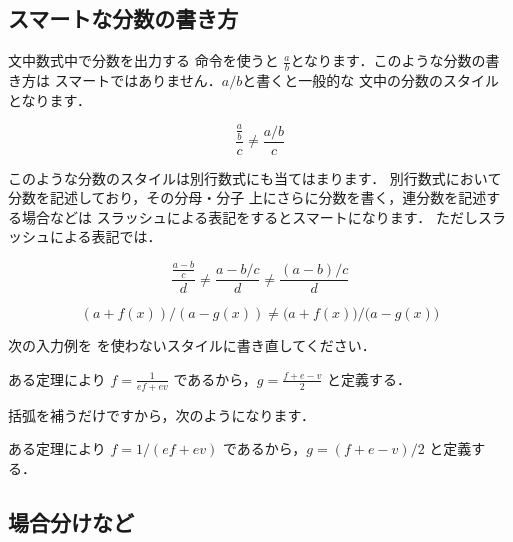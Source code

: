 \subsection{スマートな分数の書き方}
文中数式中で分数を出力する 命令を使うと
\(\frac{a}{b}\)となります．このような分数の書き方は
スマートではありません．\(a/b\)と書くと一般的な
文中の分数のスタイルとなります．
\begin{InOut}
\[ \frac{\frac{a}{b}}{c}\neq
   \frac{a/b}{c}             \]
\end{InOut}
このような分数のスタイルは別行数式にも当てはまります．
別行数式において分数を記述しており，その分母・分子
上にさらに分数を書く，連分数を記述する場合などは
スラッシュ\qu{\str/}による表記をするとスマートになります．
ただしスラッシュによる表記では．
\begin{InOut}
\begin{displaymath}
\frac{\frac{a-b}{c}}{d} \neq
\frac{a-b/c}{d} \neq \frac{(a-b)/c}{d}
\end{displaymath} 
\end{InOut}
%
\begin{InOut}
\begin{displaymath}
(a+f(x))/(a-g(x)) \neq
\bigl(a+f(x)\bigr)\big/
  \bigl(a-g(x)\bigr)
\end{displaymath} 
\end{InOut}


\begin{Exe}
次の入力例を を使わないスタイルに書き直してください．
\begin{InOut}
ある定理により $f=\frac{1}{ef + ev}$
であるから，$g=\frac{f + e - v}{2}$
と定義する．
\end{InOut}
括弧を補うだけですから，次のようになります．
\begin{InOut}
ある定理により $f=1/(ef + ev)$
であるから，$g=(f + e - v)/2$
と定義する． 
\end{InOut}
\end{Exe}


\subsection{場合分けなど}

